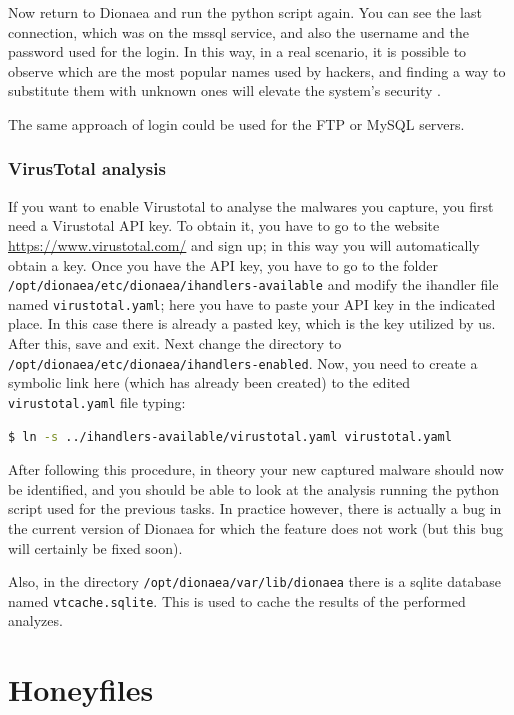 \documentclass[epsfig,a4paper,11pt,titlepage,oneside,openany]{book}
\begin{document}
Now return to Dionaea and run the python script again. You can see the last connection, which was on the mssql service, and also the username and the password used for the login. In this way, in a real scenario, it is possible to observe which are the most popular names used by hackers, and finding a way to substitute them with unknown ones will elevate the system’s security \cite{malicious_access}.

The same approach of login could be used for the FTP or MySQL servers.


\subsection{VirusTotal analysis}
If you want to enable Virustotal to analyse the malwares you capture, you first need a Virustotal API key. To obtain it, you have to go to the website \url{https://www.virustotal.com/} and sign up; in this way you will automatically obtain a key. Once you have the API key, you have to go to the folder \texttt{/opt/dionaea/etc/dionaea/ihandlers-available} and modify the ihandler file named \texttt{virustotal.yaml}; here you have to paste your API key in the indicated place. In this case there is already a pasted key, which is the key utilized by us. After this, save and exit. Next change the directory to \texttt{/opt/dionaea/etc/dionaea/ihandlers-enabled}. Now, you need to create a symbolic link here (which has already been created)  to the edited \texttt{virustotal.yaml} file typing:

\begin{lstlisting}[language=bash]
$ ln -s ../ihandlers-available/virustotal.yaml virustotal.yaml
\end{lstlisting}

\noindent After following this procedure, in theory your new captured malware should now be identified, and you should be able to look at the analysis running the python script used for the previous tasks. In practice however, there is actually a bug in the current version of Dionaea for which the feature does not work (but this bug will certainly be fixed soon).

Also, in the directory \texttt{/opt/dionaea/var/lib/dionaea} there is a sqlite database named  \linebreak \texttt{vtcache.sqlite}. This is used to cache the results of the performed analyzes.



\chapter{Honeyfiles}
\end{document}

